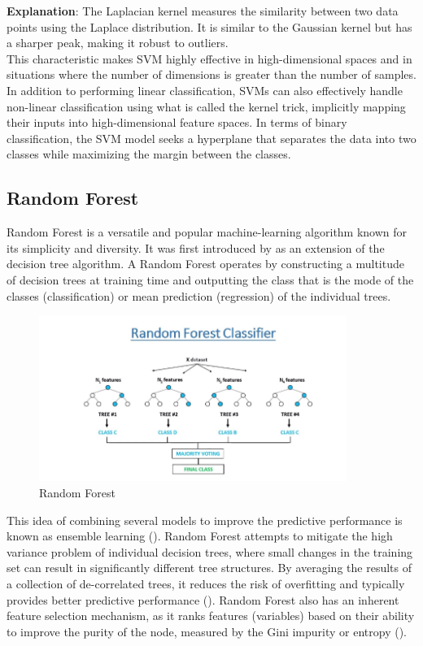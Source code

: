 \documentclass[12pt]{report}
\begin{document}
\textbf{Explanation}: The Laplacian kernel measures the similarity between two
data points using the Laplace distribution. It is similar to the Gaussian kernel
but has a sharper peak, making it robust to outliers.\\

This characteristic makes SVM highly effective in high-dimensional spaces and
in situations where the number of dimensions is greater than the number of
samples\cite{708428}. In addition to performing linear classification, SVMs can
also effectively handle non-linear classification using what is called the
kernel trick, implicitly mapping their inputs into high-dimensional feature
spaces\cite{10.1007/BFb0020217}. In terms of binary classification, the SVM
model seeks a hyperplane that separates the data into two classes while
maximizing the margin between the classes.

\newpage

\subsection*{Random Forest}
Random Forest is a versatile and popular machine-learning algorithm known for
its simplicity and diversity. It was first introduced by\cite{Breiman2001} as
an extension of the decision tree algorithm. A Random Forest operates by
constructing a multitude of decision trees at training time and outputting the
class that is the mode of the classes (classification) or mean prediction
(regression) of the individual trees. \\

\begin{figure}[ht]
      \centering
      \includegraphics[width=10cm]{./figures/how-random-forest-classifier-work.png}
      \caption{Random Forest}\label{fig:fig2}
\end{figure}

This idea of combining several models to improve the predictive performance is
known as ensemble learning (\cite{Dietterich2000}). Random Forest attempts to
mitigate the high variance problem of individual decision trees, where small
changes in the training set can result in significantly different tree
structures. By averaging the results of a collection of de-correlated trees, it
reduces the risk of overfitting and typically provides better predictive
performance (\cite{Sagi2018}). Random Forest also has an inherent feature
selection mechanism, as it ranks features (variables) based on their ability to
improve the purity of the node, measured by the Gini impurity or entropy
(\cite{DiazUriarte2006}).
\end{document}
